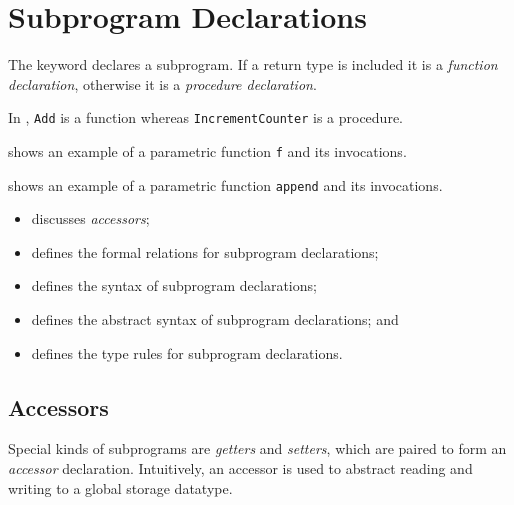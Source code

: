 \chapter{Subprogram Declarations\label{chap:SubprogramDeclarations}}

The \Tfunc{} keyword declares a subprogram. If a return type is included it is a \emph{function declaration},
otherwise it is a \emph{procedure declaration}. 

In , \verb|Add| is a function whereas \verb|IncrementCounter| is a procedure.

 shows an example of a parametric function \verb|f| and its invocations.

 shows an example of a parametric function \verb|append| and its invocations.

\ChapterOutline
\begin{itemize}
  \item {} discusses \emph{accessors};
  \item {} defines the formal relations for subprogram declarations;
  \item {} defines the syntax of subprogram declarations;
  \item {} defines the abstract syntax of subprogram declarations; and
  \item {} defines the type rules for subprogram declarations.
\end{itemize}

\section{Accessors\label{sec:Accessors}}
Special kinds of subprograms are \emph{getters} and \emph{setters}, which are paired to form an \emph{accessor}
declaration. Intuitively, an accessor is used to abstract reading and writing to a global storage datatype.


